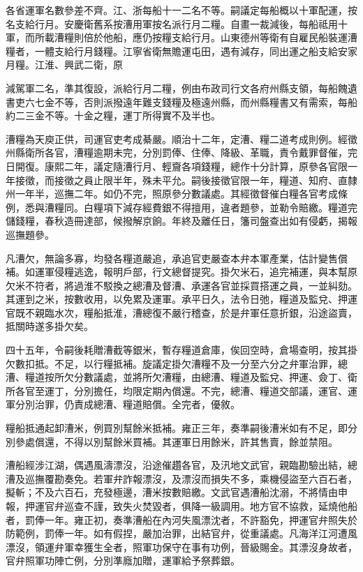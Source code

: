 \begin{pinyinscope}
各省運軍名數參差不齊。江、浙每船十一二名不等。嗣議定每船概以十軍配運，按名支給行月。安慶衛舊系按漕用軍按名派行月二糧。自畫一裁減後，每船祗用十軍，而所載漕糧則倍於他船，應仍按糧支給行月。山東德州等衛有自雇民船裝運漕糧者，一體支給行月錢糧。江寧省衛無贍運屯田，遇有減存，同出運之船支給安家月糧。江淮、興武二衛，原

減駕軍二名，準其復設，派給行月二糧，例由布政司行文各府州縣支領，每船餽遺書吏六七金不等，否則派撥遠年難支錢糧及極遠州縣，而州縣糧書又有需索，每船約二三金不等。十金之糧，運丁所得實不及半也。

漕糧為天庾正供，司運官吏考成綦嚴。順治十二年，定漕、糧二道考成則例。經徵州縣衛所各官，漕糧逾期未完，分別罰俸、住俸、降級、革職，責令戴罪督催，完日開復。康熙二年，議定隨漕行月、輕齎各項錢糧，總作十分計算，原參各官限一年接徵，而接徵之員止限半年，殊未平允。嗣後接徵官限一年，糧道、知府、直隸州一年半，巡撫二年。如仍不完，照原參分數議處。其經徵督催白糧各官考成條例，悉與漕糧同。白糧項下減存經費銀不得擅用，違者題參，並勒令賠繳。糧道完儲錢糧，春秋造冊達部，候撥解京餉。年終及離任日，籓司盤查出如有侵虧，揭報巡撫題參。

凡漕欠，無論多寡，均發各糧道嚴追，承追官吏嚴查本弁本軍產業，估計變售償補。如運軍侵糧逃逸，報明戶部，行文總督提究。掛欠米石，追完補運，與本幫原欠米不符者，將過淮不駁換之總漕及督漕、承運各官並採買搭運之員，一並糾劾。其運到之米，按數收用，以免累及運軍。承平日久，法令日弛，糧道及監兌、押運官既不親臨水次，糧船抵淮，漕總復不嚴行稽查，於是弁軍任意折銀，沿途盜賣，抵關時遂多掛欠矣。

四十五年，令嗣後耗贈漕截等銀米，暫存糧道倉庫，俟回空時，倉場查明，按其掛欠數扣抵。不足，以行糧抵補。旋議定掛欠漕糧不及一分至六分之弁軍治罪，總漕、糧道按所欠分數議處，並將所欠漕糧，由總漕、糧道及監兌、押運、僉丁、衛所各官至運丁，分別擔任，均限定期內償還。不完，總漕、糧道交部議，運官、運軍分別治罪，仍責成總漕、糧道賠償。全完者，優敘。

糧船抵通起卸漕米，例買別幫餘米抵補。雍正三年，奏準嗣後漕米如有不足，即分別參處償還，不得以別幫餘米買補。其運軍日用餘米，許其售賣，餘並禁阻。

漕船經涉江湖，偶遇風濤漂沒，沿途催趲各官，及汛地文武官，親臨勘驗出結，總漕及巡撫覆勘奏免。若軍弁詐報漂沒，及漂沒而損失不多，乘機侵盜至六百石者，擬斬；不及六百石，充發極邊，漕米按數賠繳。文武官遇漕船沈溺，不將情由申報，押運官弁巡查不謹，致失火焚毀者，俱降一級調用。地方官不協救，延燒他船者，罰俸一年。雍正初，奏準漕船在內河失風漂沈者，不許豁免，押運官弁照失於防範例，罰俸一年。如有假捏，嚴加治罪，出結官弁，從重議處。凡海洋江河遭風漂沒，領運弁軍幸獲生全者，照軍功保守在事有功例，晉級賜金。其漂沒身故者，官弁照軍功陣亡例，分別準廕加贈，運軍給予祭葬銀。


\end{pinyinscope}

